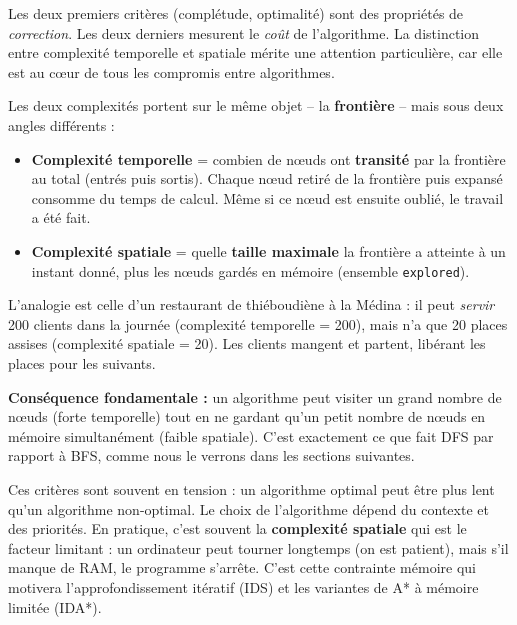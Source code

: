 \documentclass[11pt,a4paper]{article}
\begin{document}
Les deux premiers critères (complétude, optimalité) sont des propriétés de \textit{correction}. Les deux derniers mesurent le \textit{coût} de l'algorithme. La distinction entre complexité temporelle et spatiale mérite une attention particulière, car elle est au c\oe ur de tous les compromis entre algorithmes.

\begin{attentionbox}
Les deux complexités portent sur le même objet -- la \textbf{frontière} -- mais sous deux angles différents :

\begin{itemize}
    \item \textbf{Complexité temporelle} = combien de n\oe uds ont \textbf{transité} par la frontière au total (entrés puis sortis). Chaque n\oe ud retiré de la frontière puis expansé consomme du temps de calcul. Même si ce n\oe ud est ensuite oublié, le travail a été fait.
    \item \textbf{Complexité spatiale} = quelle \textbf{taille maximale} la frontière a atteinte à un instant donné, plus les n\oe uds gardés en mémoire (ensemble \texttt{explored}).
\end{itemize}

L'analogie est celle d'un restaurant de thiéboudiène à la Médina : il peut \textit{servir} 200 clients dans la journée (complexité temporelle = 200), mais n'a que 20 places assises (complexité spatiale = 20). Les clients mangent et partent, libérant les places pour les suivants.

\textbf{Conséquence fondamentale :} un algorithme peut visiter un grand nombre de n\oe uds (forte temporelle) tout en ne gardant qu'un petit nombre de n\oe uds en mémoire simultanément (faible spatiale). C'est exactement ce que fait DFS par rapport à BFS, comme nous le verrons dans les sections suivantes.
\end{attentionbox}

Ces critères sont souvent en tension : un algorithme optimal peut être plus lent qu'un algorithme non-optimal. Le choix de l'algorithme dépend du contexte et des priorités. En pratique, c'est souvent la \textbf{complexité spatiale} qui est le facteur limitant : un ordinateur peut tourner longtemps (on est patient), mais s'il manque de RAM, le programme s'arrête. C'est cette contrainte mémoire qui motivera l'approfondissement itératif (IDS) et les variantes de A* à mémoire limitée (IDA*).

\end{document}
